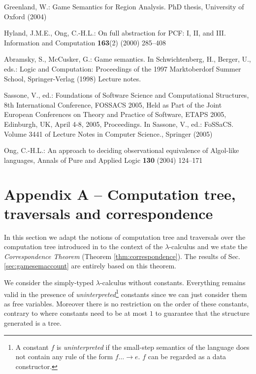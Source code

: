 \documentclass{llncs}
\begin{document}
\begin{thebibliography}{10}
Greenland, W.:
\newblock Game Semantics for Region Analysis.
\newblock PhD thesis, University of Oxford (2004)

Hyland, J.M.E., Ong, C.-H.L.:
\newblock On full abstraction for {PCF}: {I, II, and III}.
\newblock Information and Computation \textbf{163}(2) (2000)  285--408

Abramsky, S., McCusker, G.:
\newblock Game semantics.
\newblock In Schwichtenberg, H., Berger, U., eds.: Logic and Computation:
  Proceedings of the 1997 Marktoberdorf Summer School, Springer-Verlag (1998)
  Lecture notes.

Sassone, V., ed.:
\newblock Foundations of Software Science and Computational Structures, 8th
  International Conference, FOSSACS 2005, Held as Part of the Joint European
  Conferences on Theory and Practice of Software, ETAPS 2005, Edinburgh, UK,
  April 4-8, 2005, Proceedings.
\newblock In Sassone, V., ed.: FoSSaCS. Volume 3441 of Lecture Notes in
  Computer Science., Springer (2005)

Ong, C.-H.L.:
\newblock An approach to deciding observational equivalence of Algol-like languages,
\newblock Annals of Pure and Applied Logic \textbf{130} (2004)  124--171
\end{thebibliography}


\section*{Appendix A -- Computation tree, traversals and correspondence}
\label{sec:correspondence}

In this section we adapt the notions of computation tree and
traversals over the computation tree introduced in \cite{OngLics2006} to the context of the $\lambda$-calculus
and we state the \emph{Correspondence Theorem} (Theorem \ref{thm:correspondence}).
The results of Sec. \ref{sec:gamesemaccount} are entirely based on this theorem.

We consider the simply-typed $\lambda$-calculus without constants. Everything remains valid in the presence of
\emph{uninterpreted}\footnote{A constant $f$ is \emph{uninterpreted}
if the small-step semantics of the language does not contain any rule of the form $f \dots \rightarrow e$. $f$ can be regarded as a data constructor.}
constants since we can just consider them as free variables. Moreover there is no restriction on the order of these constants, contrary to \cite{OngLics2006} where constants need to be at most $1$ to guarantee that the structure generated is a tree.
\end{document}
